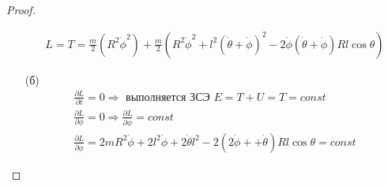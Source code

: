 \begin{proof}
\begin{itemize}
\begin{gather*}
        L = T = \frac{m}{2}(R^2 \dot{\phi}^2) + \frac{m}{2}(R^2 \dot{\phi}^2 + l^2 (\dot{\theta} + \dot{\phi})^2 - 2\dot{\phi}(\dot{\theta} + \dot{\phi})Rl \cos \theta)
    \end{gather*}
\item[(б)]
    \begin{gather*}
        \frac{\partial L}{\partial t} = 0 \Rightarrow \text{ выполняется ЗСЭ } E = T + U = T = const\\
        \frac{\partial L}{\partial \phi} = 0 \Rightarrow \frac{\partial L}{\partial \dot{\phi}} = const\\
        \frac{\partial L}{\partial \dot{\phi}} = 2m R^2 \dot{\phi} + 2l^2 \dot{\phi} + 2 \dot{\theta} l^2 - 2(2 \dot{\phi} ++ \dot{\theta}) R l \cos \theta = const  
    \end{gather*}
\end{itemize}

\end{proof}
